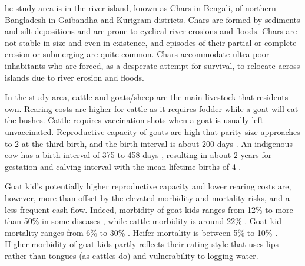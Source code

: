 
	he study area is in the river island, known as Chars in Bengali, of northern Bangladesh in Gaibandha and Kurigram districts. Chars are formed by sediments and silt depositions and are prone to cyclical river erosions and floods. Chars are not stable in size and even in existence, and episodes of their partial or complete erosion or submerging are quite common. Chars accommodate ultra-poor inhabitants who are forced, as a desperate attempt for survival, to relocate across islands due to river erosion and floods.

	In the study area, cattle and goats/sheep are the main livestock that residents own. Rearing costs are higher for cattle as it requires fodder while a goat will eat the bushes. Cattle requires vaccination shots when a goat is usually left unvaccinated. Reproductive capacity of goats are high that parity size approaches to 2 at the third birth, and the birth interval is about 200 days \citep{Hasan2014goat}. An indigenous cow has a birth interval of 375 to 458 days \citep{Hasan2018}, resulting in about 2 years for gestation and calving interval \citep{Habib2012} with the mean lifetime births of 4 \citep[][Table 1]{Hasan2018}. 
	
	Goat kid's potentially higher reproductive capacity and lower rearing costs are, however, more than offset by the elevated morbidity and mortality risks, and a less frequent cash flow. Indeed, morbidity of goat kids ranges from 12\% \citep{Mahmud2015} to more than 50\% in some diseases \citep[][Table 5]{Nandi2011}, while cattle morbidity is around 22\% \citep{Bangar2013}. Goat kid mortality ranges from 6\% \citep{Mahmud2015} to 30\% \citep[][Table 5]{Paul2014} \citep{Ershaduzzaman2007}. Heifer mortality is between 5\% \citep[][p.332R]{Hossain2014} to 10\% \citep{Alauddin2018}. Higher morbidity of goat kids partly reflects their eating style that uses lips rather than tongues (as cattles do) and vulnerability to logging water. 

